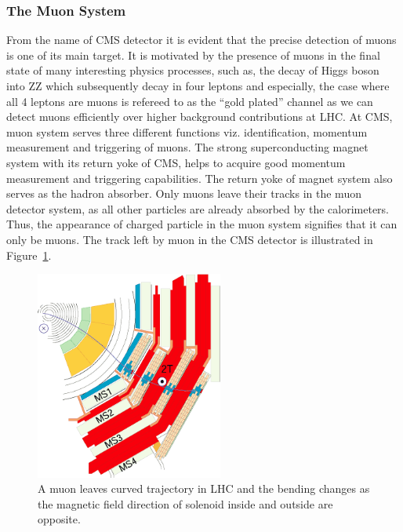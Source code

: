 

\subsubsection{The Muon System} %
\label{sub:the_muon_system}
From the name of CMS detector it is evident that the precise detection of muons is one of its main target. It is motivated by the presence of muons in the final state of many interesting physics processes, such as, the decay of Higgs boson into ZZ which subsequently decay in four leptons and especially, the case where all 4 leptons are muons is refereed to as the ``gold plated'' channel as we can detect muons efficiently over higher background contributions at LHC. At CMS, muon system serves three different functions viz. identification, momentum measurement and triggering of muons. The strong superconducting magnet system with its return yoke of CMS, helps to acquire good momentum measurement and triggering capabilities. The return yoke of magnet system also serves as the hadron absorber. Only muons leave their tracks in the muon detector system, as all other particles are already absorbed by the calorimeters. Thus, the appearance of charged particle in the muon system signifies that it can only be muons. The track left by muon in the CMS detector is illustrated in Figure~\ref{fig:muon-system-cross}. 
\begin{figure}[!htbp]
	\centering
	\includegraphics[width=0.55\textwidth]{figures/LHC/MuStations.png}
	\caption{A muon leaves curved trajectory in LHC and the bending changes as the magnetic field direction of solenoid inside and outside are opposite.}
	\label{fig:muon-system-cross}
\end{figure}
